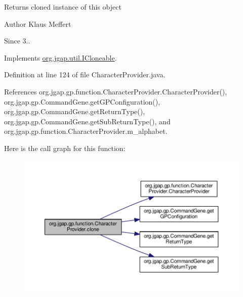 \begin{DoxyReturn}{Returns}
cloned instance of this object
\end{DoxyReturn}
\begin{DoxyAuthor}{Author}
Klaus Meffert 
\end{DoxyAuthor}
\begin{DoxySince}{Since}
3.. 
\end{DoxySince}


Implements \hyperlink{interfaceorg_1_1jgap_1_1util_1_1_i_cloneable_aa7e7d62077e6428ad7904932b1b4f7d5}{org.\-jgap.\-util.\-I\-Cloneable}.



Definition at line 124 of file Character\-Provider.\-java.



References org.\-jgap.\-gp.\-function.\-Character\-Provider.\-Character\-Provider(), org.\-jgap.\-gp.\-Command\-Gene.\-get\-G\-P\-Configuration(), org.\-jgap.\-gp.\-Command\-Gene.\-get\-Return\-Type(), org.\-jgap.\-gp.\-Command\-Gene.\-get\-Sub\-Return\-Type(), and org.\-jgap.\-gp.\-function.\-Character\-Provider.\-m\-\_\-alphabet.



Here is the call graph for this function\-:
\nopagebreak
\begin{figure}[H]
\begin{center}
\leavevmode
\includegraphics[width=350pt]{classorg_1_1jgap_1_1gp_1_1function_1_1_character_provider_a56e17a30324098c2693eee149e323382_cgraph}
\end{center}
\end{figure}


